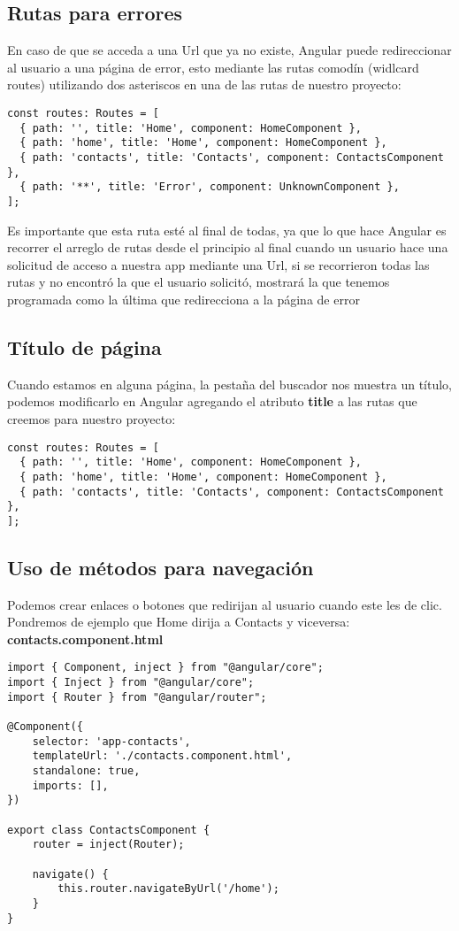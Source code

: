 \subsection{Rutas para errores}

En caso de que se acceda a una Url que ya no existe, Angular puede redireccionar al usuario a una página de error, esto mediante las rutas comodín (widlcard routes) utilizando dos asteriscos en una de las rutas de nuestro proyecto:
\begin{lstlisting}[style=htmlcssjs]
const routes: Routes = [
  { path: '', title: 'Home', component: HomeComponent },
  { path: 'home', title: 'Home', component: HomeComponent },
  { path: 'contacts', title: 'Contacts', component: ContactsComponent },
  { path: '**', title: 'Error', component: UnknownComponent },
];
\end{lstlisting}

Es importante que esta ruta esté al final de todas, ya que lo que hace Angular es recorrer el arreglo de rutas desde el principio al final cuando un usuario hace una solicitud de acceso a nuestra app mediante una Url, si se recorrieron todas las rutas y no encontró la que el usuario solicitó, mostrará la que tenemos programada como la última que redirecciona a la página de error


\subsection{Título de página}

Cuando estamos en alguna página, la pestaña del buscador nos muestra un título, podemos modificarlo en Angular agregando el atributo \textbf{title} a las rutas que creemos para nuestro proyecto:
\begin{lstlisting}[style=htmlcssjs]
const routes: Routes = [
  { path: '', title: 'Home', component: HomeComponent },
  { path: 'home', title: 'Home', component: HomeComponent },
  { path: 'contacts', title: 'Contacts', component: ContactsComponent },
];
\end{lstlisting}


\subsection{Uso de métodos para navegación}

Podemos crear enlaces o botones que redirijan al usuario cuando este les de clic. Pondremos de ejemplo que Home dirija a Contacts y viceversa:
\textbf{contacts.component.html}
\begin{lstlisting}[style=htmlcssjs]
import { Component, inject } from "@angular/core";
import { Inject } from "@angular/core";
import { Router } from "@angular/router";

@Component({
    selector: 'app-contacts',
    templateUrl: './contacts.component.html',
    standalone: true,
    imports: [],
})

export class ContactsComponent {
    router = inject(Router);

    navigate() {
        this.router.navigateByUrl('/home');
    }
}
\end{lstlisting}

